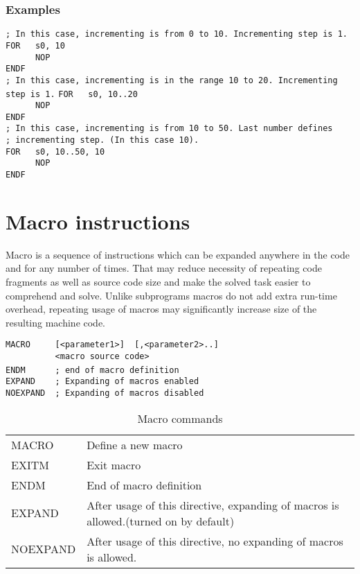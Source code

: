     \subsubsection{Examples}
        \verb'; In this case, incrementing is from 0 to 10. Incrementing step is 1.'
        \verb'FOR   s0, 10'\\
        \verb'      NOP'\\
        \verb'ENDF'
        \verb''\\
        \verb'; In this case, incrementing is in the range 10 to 20. Incrementing step is 1.'
        \verb'FOR   s0, 10..20'\\
        \verb'      NOP'\\
        \verb'ENDF'
        \verb''\\
        \verb'; In this case, incrementing is from 10 to 50. Last number defines'\\
        \verb'; incrementing step. (In this case 10).'\\
        \verb'FOR   s0, 10..50, 10'\\
        \verb'      NOP'\\
        \verb'ENDF'

\section{Macro instructions}
Macro is a sequence of instructions which can be expanded anywhere in the code and for any number of times. That may reduce necessity of repeating code fragments as well as source code size and make the solved task easier to comprehend and solve. Unlike subprograms macros do not add extra run-time overhead, repeating usage of macros may significantly increase size of the resulting machine code.

    \verb'MACRO     [<parameter1>]  [,<parameter2>..]'\\
    \verb'          <macro source code>'\\
    \verb'ENDM      ; end of macro definition'
    \verb''~\\
    \verb'EXPAND    ; Expanding of macros enabled'\\
    \verb'NOEXPAND  ; Expanding of macros disabled'

    \begin{table}[h!]
        \begin{tabular}{|ll|}
            \hline
            MACRO      & Define a new macro \\
            EXITM      & Exit macro  \\
            ENDM       & End of macro definition \\
            EXPAND     & After usage of this directive, expanding of macros is allowed.(turned on by default)\\
            NOEXPAND   & After usage of this directive, no expanding of macros is allowed.\\
            \hline
        \end{tabular}
        \caption{Macro commands}
    \end{table}

